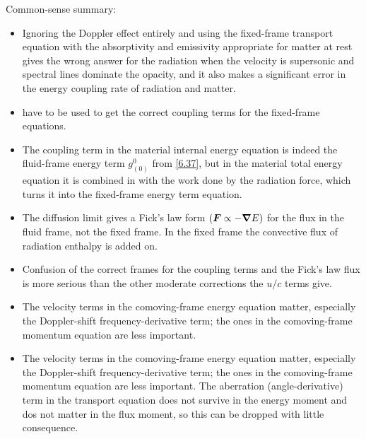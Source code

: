 Common-sense summary:
\begin{itemize}
  \item Ignoring the Doppler effect entirely and using the fixed-frame
    transport equation with the absorptivity and emissivity appropriate for
    matter at rest gives the wrong answer for the radiation when the velocity is
    supersonic and spectral  lines dominate the opacity, and it also makes a
    significant error in the energy coupling rate of radiation and matter.
  \item {} have to be used to get the correct coupling terms for
    the fixed-frame equations.
  \item The coupling term in the material internal energy equation is indeed
    the fluid-frame energy term $g_{(0)}^0$ from \cref{6.37}, but in the
    material total energy equation it is combined in with the work done by the
    radiation force, which turns it into the fixed-frame energy term equation.
  \item The diffusion limit gives a Fick's law form $(\boldsymbol{F}\propto -\boldsymbol{\nabla} E)$
    for the flux in the fluid frame, not the fixed frame. In the fixed frame
    the convective flux of radiation enthalpy is added on.
  \item Confusion of the correct frames for the coupling terms and the Fick's
    law flux is more serious than the other moderate corrections the $u/c$ terms
    give.
  \item The velocity terms in the comoving-frame energy equation matter,
    especially the Doppler-shift frequency-derivative term; the ones in the
    comoving-frame momentum equation are less important.
  \item The velocity terms in the comoving-frame energy equation matter,
    especially the Doppler-shift frequency-derivative term; the ones in the
    comoving-frame momentum equation are less important. The aberration
    (angle-derivative) term in the transport equation does not survive in the
    energy moment and dos not matter in the flux moment, so this can be dropped
    with little consequence.
\end{itemize}


